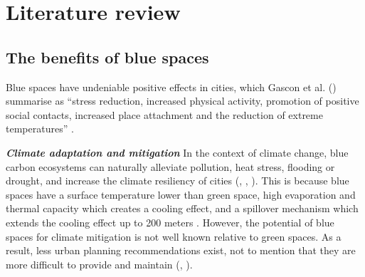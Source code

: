 \documentclass{article}
\newcommand{\bisection}[1]{\textbf{\textit{#1}}}
\begin{document}
\section{Literature review}



\subsection{The benefits of blue spaces}

Blue spaces have undeniable positive effects in cities, which Gascon et al. (\citeyear{gascon2017outdoor}) summarise as ``stress reduction, increased physical activity, promotion of positive social contacts, increased place attachment and the reduction of extreme temperatures'' \parencite{gascon2017outdoor}.

\bisection{Climate adaptation and mitigation}
In the context of climate change, blue carbon ecosystems can naturally alleviate pollution, heat stress, flooding or drought, and increase the climate resiliency of cities (\cite{lin2020water}, \cite{manteghi2015water}, \cite{o2021international}). 
This is because blue spaces have a surface temperature lower than green space, high evaporation and thermal capacity which creates a cooling effect, and a spillover mechanism which extends the cooling effect up to 200 meters \parencite{lin2020water}.
However, the potential of blue spaces for climate mitigation is not well known relative to green spaces. As a result, less urban planning recommendations exist, not to mention that they are more difficult to provide and maintain (\cite{manteghi2015water}, \cite{volker2013evidence}).
\end{document}
